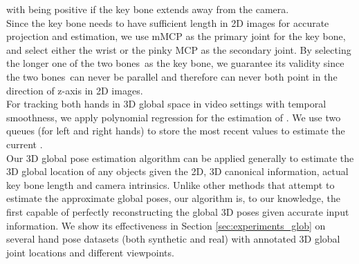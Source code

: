 \documentclass[10pt,twocolumn,letterpaper]{article}
\begin{document}
with  being positive if the key bone extends away from the camera.\\
\indent Since the key bone needs to have sufficient length in 2D images for accurate projection and estimation, we use mMCP as the primary joint for the key bone, and select either the wrist or the pinky MCP as the secondary joint. By selecting the longer one of the two \textquotedbl bones\textquotedbl\ as the key bone, we guarantee its validity since the two \textquotedbl bones\textquotedbl\ can never be parallel and therefore can never both point in the direction of z-axis in 2D images.\\
\indent For tracking both hands in 3D global space in video settings with temporal smoothness, we apply polynomial regression for the estimation of . We use two queues (for left and right hands) to store the most recent  values to estimate the current .\\
\indent Our 3D global pose estimation algorithm can be applied generally to estimate the 3D global location of any objects given the 2D, 3D canonical information, actual key bone length and camera intrinsics. Unlike other methods \cite{Moon,Rogez} that attempt to estimate the approximate global poses, our algorithm is, to our knowledge, the first capable of perfectly reconstructing the global 3D poses given accurate input information. We show its effectiveness in Section \ref{sec:experiments_glob} on several hand pose datasets (both synthetic and real) with annotated 3D global joint locations and different viewpoints.
\end{document}
